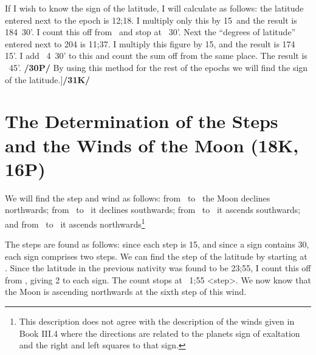 If I wish to know the sign of the latitude, I will calculate as follows: the latitude entered next to the epoch is 12;18. I multiply only this by 15\deg\, and the result is 184\deg\, 30'. I count this off from \Leo\, and stop
at \deg\, 30'. Next the “degrees of latitude” entered next to 204 is 11;37. I multiply this figure by
15\deg, and the result is 174\deg\, 15'. I add \Aquarius\, 4\deg\, 30' to this and count the sum off from the same place. The result is \deg\, 45'. \textbf{/30P/} By using this method for the rest of the epochs we will find the sign of the latitude.]\textbf{/31K/}

\newpage
\section{The Determination of the Steps and the Winds of the Moon (18K, 16P)}
We will find the step and wind as follows: from \Leo\, to \Libra\, the Moon declines northwards; from \Scorpio\, to \Capricorn\, it declines southwards; from \Aquarius\, to \Aries\, it ascends southwards; and from \Taurus\, to \Cancer\, it ascends northwards\footnote{This description does not agree with the description of the winds given in Book III.4 where the directions are related to the planets sign of exaltation and the right and left squares to that sign.}

The steps are found as follows: since each step is 15\deg, and since a sign contains 30\deg, each sign comprises two steps. We can find the step of the latitude by starting at \Leo. Since the latitude in the previous nativity was found to be 23;55, I count this off from \Leo, giving 2 to each sign. The count stops at \Cancer\, 1;55 <step>. We now know that the Moon is ascending northwards at the sixth step of this wind.

\newpage